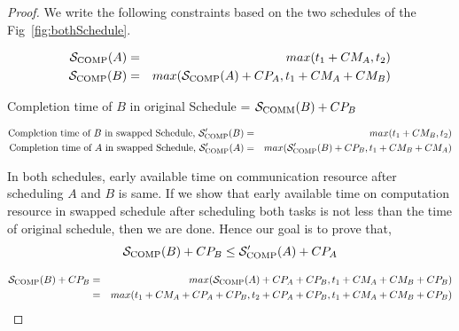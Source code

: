 \documentclass[runningheads]{llncs} %
\newcommand{\scomm}{\ensuremath{{\cal S}_{\text{COMM}}}}
\newcommand{\scomp}{\ensuremath{{\cal S}_{\text{COMP}}}}
\begin{document}
\begin{proof}
	We write the following constraints based on the two schedules of the Fig~\ref{fig:bothSchedule}.
	
	\begin{eqnarray*}
		\scomp(A) & = & max(t_1 + CM_A, t_2) \\
		\scomp(B) & = & max(\scomp(A) + CP_A,  t_1 + CM_A + CM_B)
	\end{eqnarray*}
	
	Completion time of $B$ in original Schedule = $\scomm(B) + CP_B$
	
	\begin{eqnarray*}
		\text{Completion time of $B$ in swapped Schedule, } \scomp '(B) & = & max(t_1 + CM_B, t_2)\\
		\text{Completion time of $A$ in swapped Schedule, } \scomp '(A) & = & max(\scomp'(B) + CP_B, t_1 + CM_B + CM_A)
	\end{eqnarray*}
	
	In both schedules, early available time on communication resource after scheduling $A$ and $B$ is same. If we show that early available time on computation resource in swapped schedule after scheduling both tasks is not less than the time of original schedule, then we are done. Hence our goal is to prove that,		
	$$\scomp(B) + CP_B \le \scomp'(A) + CP_A $$
	
	
	
	\begin{eqnarray*}
		\scomp(B) + CP_B & = & max(\scomp(A) + CP_A + CP_B,  t_1 + CM_A + CM_B + CP_B)\\
		& = & max(t_1 + CM_A + CP_A + CP_B, t_2 + CP_A + CP_B, t_1 + CM_A + CM_B + CP_B) 
	\end{eqnarray*}
	

\end{proof}
\end{document}
